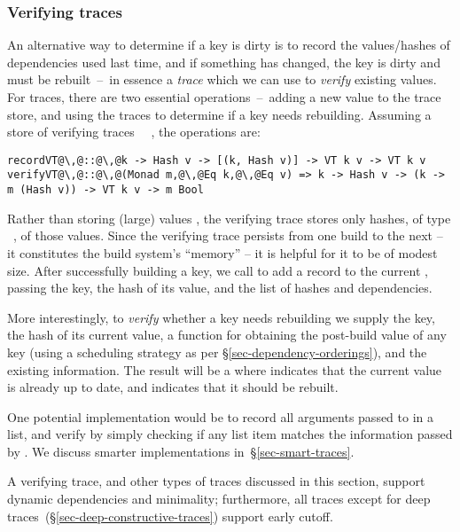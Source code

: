 \vspace{-2mm}
\subsubsection{Verifying traces}\label{sec-verifying-traces}

An alternative way to determine if a key is dirty is to record the
values/hashes of dependencies used last time, and if something has changed, the
key is dirty and must be rebuilt~--~in essence a \emph{trace} which we can use
to \emph{verify} existing values. For traces, there are two essential
operations~--~adding a new value to the trace store, and using the traces to
determine if a key needs rebuilding. Assuming a store of verifying traces
~~, the operations are:

\begin{verbatim}
recordVT@\,@::@\,@k -> Hash v -> [(k, Hash v)] -> VT k v -> VT k v
verifyVT@\,@::@\,@(Monad m,@\,@Eq k,@\,@Eq v) => k -> Hash v -> (k -> m (Hash v)) -> VT k v -> m Bool
\end{verbatim}

\noindent
Rather than storing (large) values , the verifying trace  stores
only hashes, of type ~, of those values. Since the verifying
trace persists from one build to the next -- it constitutes the build system's
``memory'' -- it is helpful for it to be of modest size. After successfully
building a key, we call  to add a record to the current ,
passing the key, the hash of its value, and the list of hashes and dependencies.

More interestingly, to \emph{verify} whether a key needs rebuilding we supply
the key, the hash of its current value, a function for obtaining the post-build
value of any key (using a scheduling strategy as per
\S\ref{sec-dependency-orderings}), and the existing  information. The
result will be a  where  indicates that the current value is
already up to date, and  indicates that it should be rebuilt.

One potential implementation would be to record all arguments passed to
 in a list, and verify by simply checking if any list item matches
the information passed by .  We discuss smarter implementations
in~\S\ref{sec-smart-traces}.

A verifying trace, and other types of traces discussed in this section, support
dynamic dependencies and minimality; furthermore, all traces except for deep
traces~(\S\ref{sec-deep-constructive-traces}) support early cutoff.

